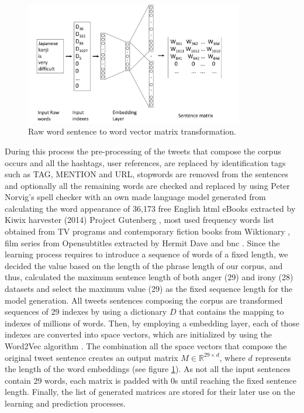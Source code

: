\begin{figure}[!htp]
  \center
  \includegraphics[width=0.85\textwidth]{figures/raw_text_word_vector_transformation}
  \caption{Raw word sentence to word vector matrix transformation.}
  \label{fig:raw_text_word_vector_transformation}
\end{figure}

During this process the pre-processing of the tweets that compose the corpus occurs and all the hashtags, user references,  are replaced by identification tags such as TAG, MENTION and URL, stopwords are removed from the sentences and optionally all the remaining words are checked and replaced by using Peter Norvig's spell checker \cite{PeterNorvigSpell} with an own made language model generated from calculating the word appearance of 36,173 free English \acrshort{html} eBooks extracted by Kiwix harvester (2014) \cite{kiwix} Project Gutenberg \cite{projectGutenberg}, most used frequency words list obtained from TV programs and contemporary fiction books from Wiktionary \cite{WiktionaryFL}, film series from Opensubtitles extracted by Hermit Dave \cite{openSubtitlesFL} and \acrfull{bnc} \cite{bncFLAdamK}. Since the learning process requires to introduce a sequence of words of a fixed length, we decided the value based on the length of the phrase length of our corpus, and thus, calculated the maximum sentence length of both anger (29) and irony (28) datasets and select the maximum value (29) as the fixed sequence length for the model generation. All tweets sentences composing the corpus are transformed sequences of 29 indexes by using a dictionary $D$ that contains the mapping to indexes of millions of words. Then, by employing a embedding layer, each of those indexes are converted into space vectors, which are initialized by using the Word2Vec algorithm \cite{mikolov2013efficient}. The combination all the space vectors that compose the original tweet sentence creates an output matrix $M\in\mathbb{R}^{29 \times d}$, where $d$ represents the length of the word embeddings (see figure \ref{fig:raw_text_word_vector_transformation}). As not all the input sentences contain 29 words, each matrix is padded with 0s until reaching the fixed sentence length. Finally, the list of generated matrices are stored for their later use on the learning and prediction processes.

